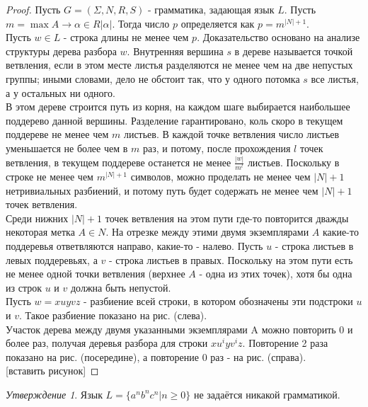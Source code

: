\documentclass[a4paper]{article}
\theoremstyle{indented}
\theoremstyle{definition}
\theoremstyle{remark}
\newtheorem{stat}{Утверждение}
\DeclareMathOperator{\ra}{\rightarrow}
\begin{document}
\begin{proof}
    Пусть $G = (\Sigma,N,R,S)$ - грамматика, задающая язык $L$. Пусть $m = \max A \ra \alpha \in R |\alpha|$. Тогда число $p$ определяется как $p = m^{|N|+1}$. \\ 

    Пусть $w \in L$ - строка длины не менее чем $p$. Доказательство основано на анализе структуры дерева разбора $w$. Внутренняя вершина $s$ в дереве называется точкой ветвления, если в этом месте листья разделяются не менее чем на две непустых группы; иными словами, дело не обстоит так, что у одного потомка $s$ все листья, а у остальных ни одного. \\ 

    В этом дереве строится путь из корня, на каждом шаге выбирается наибольшее поддерево данной вершины. Разделение гарантировано, коль скоро в текущем поддереве не менее чем $m$ листьев. В каждой точке ветвления число листьев уменьшается не более чем в $m$ раз, и потому, после прохождения $l$ точек ветвления, в текущем поддереве останется не менее $\frac{|w|}{m^l}$ листьев. Поскольку в строке не менее чем $m^{|N|+1}$ символов, можно проделать не менее чем $|N | + 1$ нетривиальных разбиений, и потому путь будет содержать не менее чем $|N | + 1$ точек ветвления. \\ 

    Среди нижних $|N | + 1$ точек ветвления на этом пути где-то повторится дважды некоторая метка $A \in N$. На отрезке между этими двумя экземплярами $A$ какие-то поддеревья ответвляются направо, какие-то - налево. Пусть $u$ - строка листьев в левых поддеревьях, а $v$ - строка листьев в правых. Поскольку на этом пути есть не менее одной точки ветвления (верхнее $A$ - одна из этих точек), хотя бы одна из строк $u$ и $v$ должна быть непустой. \\ 

    Пусть $w = xuyvz$ - разбиение всей строки, в котором обозначены эти подстроки $u$ и $v$. Такое разбиение показано на рис. (слева). \\ 

    Участок дерева между двумя указанными экземплярами A можно повторить 0 и более раз, получая деревья разбора для строки $xu^iyv^iz$. Повторение 2 раза показано на рис. (посередине), а повторение 0 раз - на рис. (справа). \\ 

    [вставить рисунок]
\end{proof}

\begin{stat}
    Язык $L = \{ a^n b^n c^n | n \geq 0 \}$ не задаётся никакой грамматикой.
\end{stat}
\end{document}
